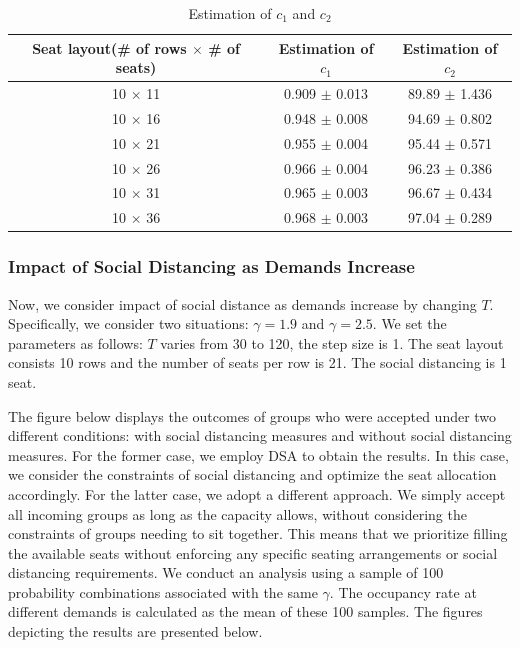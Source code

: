 \begin{table}[ht]
  \centering
  \caption{Estimation of $c_1$ and $c_2$}
  \begin{tabular}{|c|c|c|}
  \hline
   Seat layout(\# of rows $\times$ \# of seats) & Estimation of $c_1$ & Estimation of $c_2$  \\
  \hline
   10 $\times$ 11 & 0.909 $\pm$ 0.013  & 89.89 $\pm$ 1.436 \\
   10 $\times$ 16 & 0.948 $\pm$ 0.008  & 94.69 $\pm$ 0.802 \\
   10 $\times$ 21 & 0.955 $\pm$ 0.004 & 95.44 $\pm$ 0.571 \\
   10 $\times$ 26 & 0.966 $\pm$ 0.004 & 96.23 $\pm$ 0.386 \\
   10 $\times$ 31 & 0.965 $\pm$ 0.003 & 96.67 $\pm$ 0.434 \\
   10 $\times$ 36 & 0.968 $\pm$ 0.003 & 97.04 $\pm$ 0.289 \\
   \hline
  \end{tabular}
\end{table}




\subsubsection{Impact of Social Distancing as Demands Increase}
Now, we consider impact of social distance as demands increase by changing $T$. Specifically, we consider two situations: $\gamma = 1.9$ and $\gamma = 2.5$. We set the parameters as follows: $T$ varies from 30 to 120, the step size is 1.  The seat layout consists 10 rows and the number of seats per row is 21. The social distancing is 1 seat.

The figure below displays the outcomes of groups who were accepted under two different conditions: with social distancing measures and without social distancing measures. For the former case, we employ DSA to obtain the results. In this case, we consider the constraints of social distancing and optimize the seat allocation accordingly. For the latter case, we adopt a different approach. We simply accept all incoming groups as long as the capacity allows, without considering the constraints of groups needing to sit together. This means that we prioritize filling the available seats without enforcing any specific seating arrangements or social distancing requirements. We conduct an analysis using a sample of 100 probability combinations associated with the same $\gamma$. The occupancy rate at different demands is calculated as the mean of these 100 samples. The figures depicting the results are presented below.

